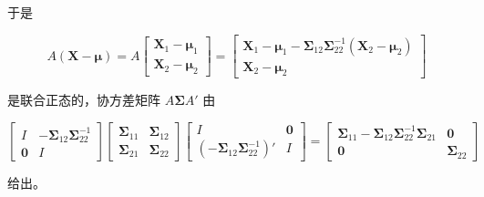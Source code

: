 于是

\[
A(\mathbf{X}-\boldsymbol{\mu})=A\begin{bmatrix}\mathbf{X}_1-\boldsymbol{\mu}_1\\\mathbf{X}_2-\boldsymbol{\mu}_2\end{bmatrix}
=\begin{bmatrix}
\mathbf{X}_1-\boldsymbol{\mu}_1-\boldsymbol{\Sigma}_{12}\boldsymbol{\Sigma}_{22}^{-1}(\mathbf{X}_2-\boldsymbol{\mu}_2)\\[2pt]
\mathbf{X}_2-\boldsymbol{\mu}_2
\end{bmatrix}
\]

是联合正态的，协方差矩阵 $A\boldsymbol{\Sigma}A'$ 由

\[
\begin{bmatrix}
I & -\boldsymbol{\Sigma}_{12}\boldsymbol{\Sigma}_{22}^{-1}\\
\mathbf{0} & I
\end{bmatrix}
\begin{bmatrix}
\boldsymbol{\Sigma}_{11} & \boldsymbol{\Sigma}_{12}\\
\boldsymbol{\Sigma}_{21} & \boldsymbol{\Sigma}_{22}
\end{bmatrix}
\begin{bmatrix}
I & \mathbf{0}\\
(-\boldsymbol{\Sigma}_{12}\boldsymbol{\Sigma}_{22}^{-1})' & I
\end{bmatrix}
=\begin{bmatrix}
\boldsymbol{\Sigma}_{11}-\boldsymbol{\Sigma}_{12}\boldsymbol{\Sigma}_{22}^{-1}\boldsymbol{\Sigma}_{21} & \mathbf{0}\\
\mathbf{0} & \boldsymbol{\Sigma}_{22}
\end{bmatrix}
\]

给出。

